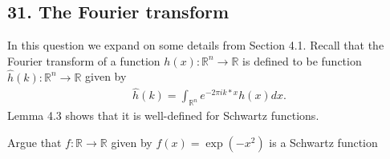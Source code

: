 \subsection*{31. The Fourier transform}
In this question we expand on some details from Section 4.1. Recall that the Fourier transform
of a function $h(x) : \mathbb{R}^{n} \to  \mathbb{R} $ is defined to be function $\hat{h}(k) : \mathbb{R}^{n}  \to  \mathbb{R}$  given by 
\begin{align*}
  \hat{h}(k) = \int_{\mathbb{R}^{n} } e^{-2\pi ik*x} h(x)dx
.\end{align*}
Lemma 4.3 shows that it is well-defined for Schwartz functions.
\begin{exercise}[a]
  Argue that $f : \mathbb{R} \to \mathbb{R} $  given by $f(x) = \exp(-x^2)$ is a Schwartz function
\end{exercise}
